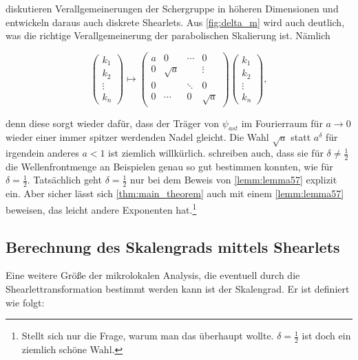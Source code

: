 \textcite{Guo2006} diskutieren Verallgemeinerungen der Schergruppe in höheren Dimensionen und entwickeln daraus auch diskrete Shearlets. Aus \cref{fig:delta_m} wird auch deutlich, was die richtige Verallgemeinerung der parabolischen Skalierung ist. Nämlich

\begin{equation*}
\begin{pmatrix}
k_1 \\ k_2 \\ \vdots \\ k_n
\end{pmatrix}
\mapsto
\begin{pmatrix}
	a & 0 		& \cdots & 0\\
	0 & \sqrt a & 		 & 	\vdots\\
	0 & 			& \ddots & 0 \\
	0 & \cdots  & 	0    & \sqrt{a}
\end{pmatrix}
\begin{pmatrix}
k_1 \\ k_2 \\ \vdots \\ k_n
\end{pmatrix},
\end{equation*}

denn diese sorgt wieder dafür, dass der Träger von $\psi_{ast}$ im Fourierraum für $a \to 0$ wieder einer immer spitzer werdenden Nadel gleicht. Die Wahl $\sqrt{a}$ statt $a^\delta$ für irgendein anderes $a<1$ ist ziemlich willkürlich. \textcite{Kutyniok2008} schreiben auch, dass sie für $\delta \neq \frac{1}{2}$ die Wellenfrontmenge an Beispielen genau so gut bestimmen konnten, wie für $\delta = \frac{1}{2}$. Tatsächlich geht $\delta = \frac{1}{2}$ nur bei dem Beweis von \cref{lemm:lemma57} explizit ein. Aber sicher lässt sich \cref{thm:main_theorem} auch mit einem \cref{lemm:lemma57} beweisen, das leicht andere Exponenten hat.\footnote{Stellt sich nur die Frage, warum man das überhaupt wollte. $\delta = \frac{1}{2}$ ist doch ein ziemlich schöne Wahl.}

\subsection{Berechnung des Skalengrads mittels Shearlets}
\label{sec:scaling_degree}
Eine weitere Größe der mikrolokalen Analysis, die eventuell durch die Shearlettransformation bestimmt werden kann ist der Skalengrad. Er ist definiert wie folgt:

